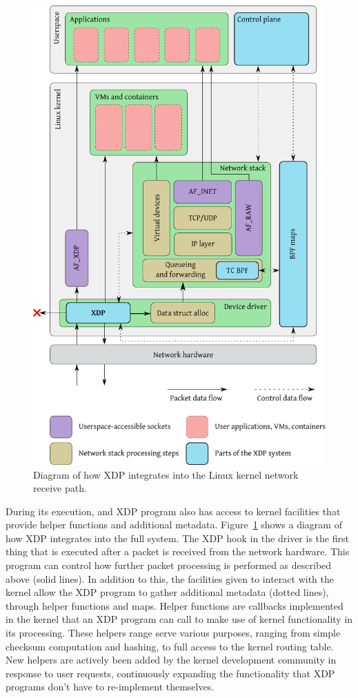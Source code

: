 \documentclass[10pt]{sig-alternate-05-2015}
\begin{document}
\begin{figure}[t]
\centering
\includegraphics[width=\linewidth]{figures/kernel-diagram.pdf}
\caption{\label{fig:xdp-kernel} Diagram of how XDP integrates into the Linux
  kernel network receive path.}
\end{figure}

During its execution, and XDP program also has access to kernel facilities that
provide helper functions and additional metadata. Figure~\ref{fig:xdp-kernel}
shows a diagram of how XDP integrates into the full system. The XDP hook in the
driver is the first thing that is executed after a packet is received from the
network hardware. This program can control how further packet processing is
performed as described above (solid lines). In addition to this, the facilities
given to interact with the kernel allow the XDP program to gather additional
metadata (dotted lines), through helper functions and maps. Helper functions are
callbacks implemented in the kernel that an XDP program can call to make use of
kernel functionality in its processing. These helpers range serve various
purposes, ranging from simple checksum computation and hashing, to full access
to the kernel routing table. New helpers are actively been added by the kernel
development community in response to user requests, continuously expanding the
functionality that XDP programs don't have to re-implement themselves.
\end{document}
